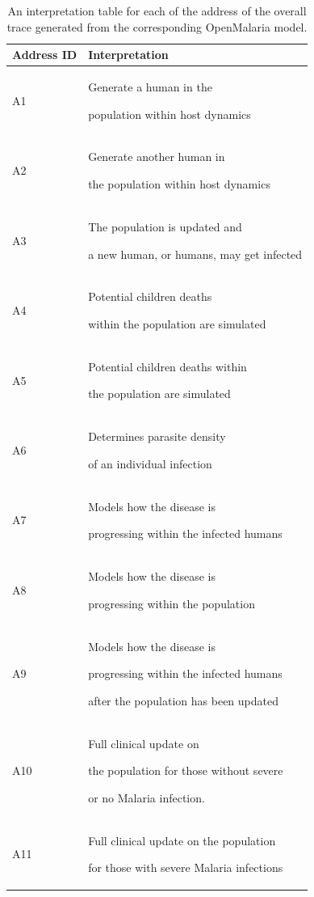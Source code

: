 \documentclass{article}
\begin{document}
\begin{table}[h!]
  \footnotesize
  \setlength{\tabcolsep}{1mm}
  \caption{An interpretation table for each of the address of the 
  overall trace generated from the corresponding OpenMalaria model.}
  \label{table:addresses}
  \begin{tabularx}{0.46\textwidth}{@{}lX@{}} 
    \toprule
    Address ID & Interpretation \\
    \midrule
  A1 & Generate a human in the

   population within host dynamics\\

  
  A2 & Generate another human in

   the population within host dynamics\\

  A3 & The population is updated and 

  a new human, or humans, may get infected \\

  A4 & Potential children deaths 

  within the population are simulated \\
  A5 & Potential children deaths within

   the population are simulated \\

  A6 & Determines parasite density

   of an individual infection \\

  A7 & Models how the disease is 

  progressing within the infected humans \\

	A8 & Models how the disease is

	 progressing within the population \\
  
  A9 & Models how the disease is 

  progressing within the infected humans

   after the population has been updated\\

  A10 & Full clinical update on 

  the population for those without severe

  or no Malaria infection. \\

A11 & Full clinical update on the population 

for those with severe Malaria infections \\
\bottomrule
  \end{tabularx}
  \end{table}


\end{document}
